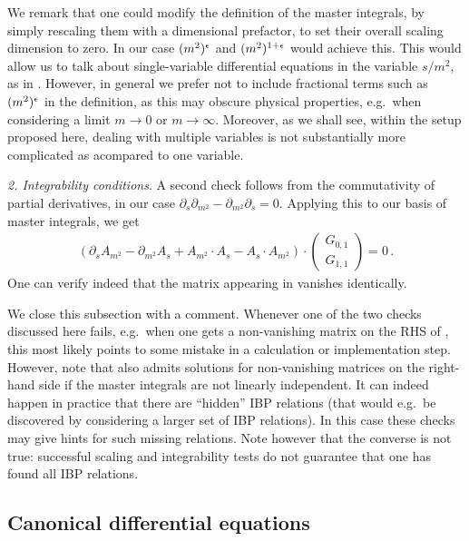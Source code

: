 We remark that one could modify the definition of the master integrals, by simply rescaling them with a dimensional prefactor, to set their overall scaling dimension to zero. In our case $(m^2)^{\epsilon}$ and $(m^2)^{1+\epsilon}$ would achieve this. This would allow us to talk about single-variable differential equations in the variable $s/m^2$, as in .
However, in general we prefer not to include fractional terms such as $(m^2)^{\epsilon}$ in the definition, as this may obscure physical properties, e.g.\ when considering a limit $m\to 0$ or $m\to \infty$. Moreover, as we shall see, within the setup proposed here, dealing with multiple variables is not substantially more complicated as acompared to one variable.

\smallskip

{\it 2. Integrability conditions}.
A second check follows from the commutativity of partial derivatives, in our case $\partial_s \partial_{m^2}  -\partial_{m^2} \partial_{s} = 0$.
Applying this to our basis of master integrals, we get
\begin{align}\label{eq:integrability}
\left( \partial_{s} A_{m^2} - \partial_{m^2} A_{s} + A_{m^2} \cdot A_{s} - A_{s} \cdot A_{m^2} \right) \cdot \begin{pmatrix}
G_{0,1} \\
G_{1,1}
\end{pmatrix} =0 \,.
\end{align}  
One can verify indeed that the matrix appearing in  vanishes identically.

\smallskip 

We close this subsection with a comment. Whenever one of the two checks discussed here fails, e.g.\ when one gets a non-vanishing matrix on the RHS of , this most likely points to some mistake in a calculation or implementation step. However, note that  also admits solutions for non-vanishing matrices on the right-hand side if the master integrals are not linearly independent. It can indeed happen in practice that there are ``hidden'' IBP relations (that would e.g.\ be discovered by considering a larger set of IBP relations). In this case these checks may give hints for such missing relations. Note however that the converse is not true: successful scaling and integrability tests do not guarantee that one has found all IBP relations. 


\subsection{Canonical differential equations}
\label{sec:canonical}

